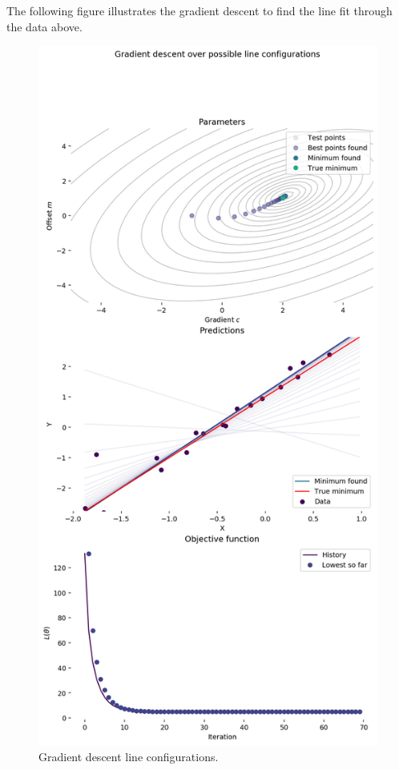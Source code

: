 \documentclass[a4paper, openany]{memoir}
\begin{document}
The following figure illustrates the gradient descent to find the line fit through the data above.
\begin{figure}[H]
    \centering
    \includegraphics[scale=0.5]{src/4.29 gradient descent line configurations.png}
    \caption{Gradient descent line configurations.}
\end{figure}
\end{document}

